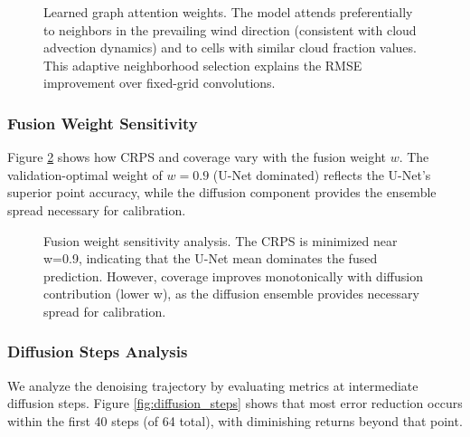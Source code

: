 \documentclass[preprint,12pt]{elsarticle}
\begin{document}
\begin{figure}[htbp]
\centering
{}
\caption{Learned graph attention weights. The model attends preferentially to neighbors in the prevailing wind direction (consistent with cloud advection dynamics) and to cells with similar cloud fraction values. This adaptive neighborhood selection explains the RMSE improvement over fixed-grid convolutions.}
\label{fig:attention_weights}
\end{figure}

\subsubsection{Fusion Weight Sensitivity}

Figure \ref{fig:fusion_sensitivity} shows how CRPS and coverage vary with the fusion weight $w$. The validation-optimal weight of $w=0.9$ (U-Net dominated) reflects the U-Net's superior point accuracy, while the diffusion component provides the ensemble spread necessary for calibration.

\begin{figure}[htbp]
\centering
{}
\caption{Fusion weight sensitivity analysis. The CRPS is minimized near w=0.9, indicating that the U-Net mean dominates the fused prediction. However, coverage improves monotonically with diffusion contribution (lower w), as the diffusion ensemble provides necessary spread for calibration.}
\label{fig:fusion_sensitivity}
\end{figure}

\subsubsection{Diffusion Steps Analysis}

We analyze the denoising trajectory by evaluating metrics at intermediate diffusion steps. Figure \ref{fig:diffusion_steps} shows that most error reduction occurs within the first 40 steps (of 64 total), with diminishing returns beyond that point.
\end{document}

